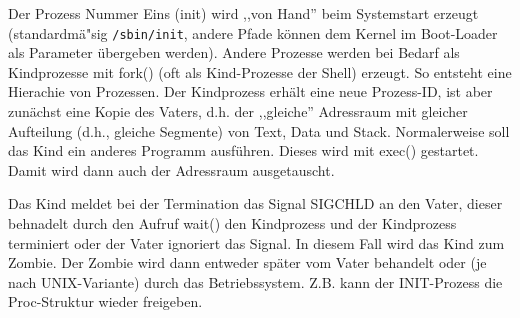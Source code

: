\begin{answer}
  Der Prozess Nummer Eins (init) wird ,,von Hand'' beim Systemstart erzeugt (standardmä"sig \texttt{/sbin/init}, andere Pfade können dem Kernel im Boot-Loader als Parameter übergeben werden).
  Andere Prozesse werden bei Bedarf als Kindprozesse mit fork() (oft als Kind-Prozesse
  der Shell) erzeugt. So entsteht eine Hierachie von Prozessen. Der Kindprozess erhält eine
  neue Prozess-ID, ist aber zunächst eine Kopie des Vaters, d.h. der ,,gleiche'' Adressraum
  mit gleicher Aufteilung (d.h., gleiche Segmente) von Text, Data und Stack. Normalerweise soll das Kind ein anderes
  Programm ausführen. Dieses wird mit exec() gestartet. Damit wird dann auch der
  Adressraum ausgetauscht.
\end{answer}

\begin{answer}
  Das Kind meldet bei der Termination das Signal SIGCHLD an den Vater, dieser behnadelt
  durch den Aufruf wait() den Kindprozess und der Kindprozess terminiert
  oder der Vater ignoriert das Signal. In diesem Fall wird das Kind zum Zombie. Der Zombie
  wird dann entweder später vom Vater behandelt oder (je nach UNIX-Variante) durch das
  Betriebssystem. Z.B. kann der INIT-Prozess die Proc-Struktur wieder freigeben.
\end{answer}

